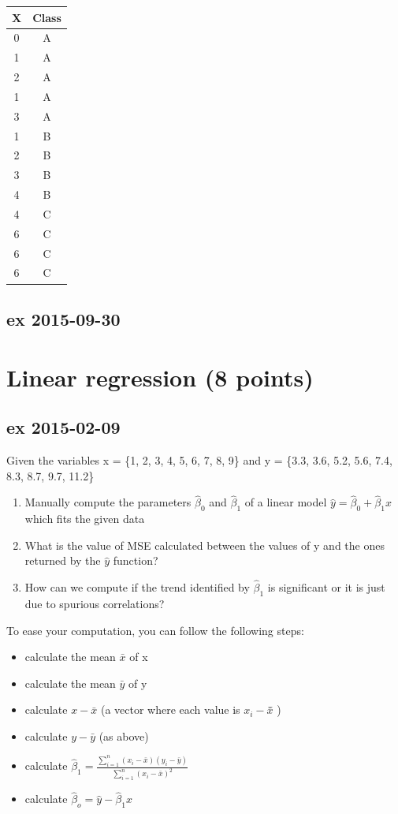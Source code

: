 \documentclass[a4paper,12pt,titlepage]{article} %
\begin{document}
\begin{center}
  \begin{tabular}{c|c}
    X & Class \\
    \hline
    \hline
    0 & A \\
    1 & A \\
    2 & A \\
    1 & A \\
    3 & A \\
    \hline
    1 & B \\
    2 & B \\
    3 & B \\
    4 & B \\
    \hline
    4 & C \\
    6 & C \\
    6 & C \\
    6 & C \\
  \end{tabular}
\end{center}

\subsection{ex 2015-09-30}

\section{Linear regression (8 points)}
\subsection{ex 2015-02-09}
Given the variables x = \{1, 2, 3, 4, 5, 6, 7, 8, 9\} and y = \{3.3, 3.6, 5.2, 5.6, 7.4, 8.3, 8.7, 9.7, 11.2\}
\begin{enumerate}
\item Manually compute the parameters $\hat{\beta}_{0} $ and $\hat{\beta}_{1} $ of a linear model $ \hat{y} = \hat{\beta}_{0} + \hat{\beta}_{1} x$ which fits the given data
\item What is the value of MSE calculated between the values of y and the ones returned by the $\hat{y}$ function?
\item How can we compute if the trend identified by $\hat{\beta}_{1}$ is significant or it is just due to spurious correlations?
\end{enumerate}
 
To ease your computation, you can follow the following steps:
\begin{itemize}
\item calculate the mean $\bar{x}$ of x
\item calculate the mean $\bar{y}$ of y
\item calculate $ x - \bar{x} $ (a vector where each value is $ x_{i} - \bar{x} $̄ )
\item calculate $ y - \bar{y} $ (as above)
\item calculate $ \hat{\beta}_{1} = \frac{\sum_{i=1}^{n} (x_{i}-\bar{x}) (y_{i}-\bar{y})}{ \sum_{i=1}^{n} (x_{i}-\bar{x})^{2} } $
\item calculate $ \hat{\beta}_{o} = \hat{y} - \hat{\beta}_{1} x $
\end{itemize}
\end{document}
